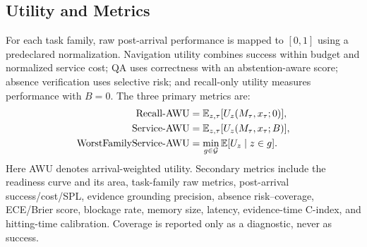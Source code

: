 \subsection{Utility and Metrics}

For each task family, raw post-arrival performance is mapped to $[0,1]$ using a predeclared normalization.
Navigation utility combines success within budget and normalized service cost; QA uses correctness with an abstention-aware score; absence verification uses selective risk; and recall-only utility measures performance with $B=0$.
The three primary metrics are:
\begin{align}
\mathrm{Recall}\text{-}\mathrm{AWU} &=
\mathbb{E}_{z,\tau}[U_z(M_\tau,x_\tau;0)],\\
\mathrm{Service}\text{-}\mathrm{AWU} &=
\mathbb{E}_{z,\tau}[U_z(M_\tau,x_\tau;B)],\\
\mathrm{WorstFamilyService}\text{-}\mathrm{AWU} &=
\min_{g\in\mathcal{G}}\mathbb{E}[U_z\mid z\in g].
\end{align}
Here AWU denotes arrival-weighted utility.
Secondary metrics include the readiness curve and its area, task-family raw metrics, post-arrival success/cost/SPL, evidence grounding precision, absence risk--coverage, ECE/Brier score, blockage rate, memory size, latency, evidence-time C-index, and hitting-time calibration.
Coverage is reported only as a diagnostic, never as success.
